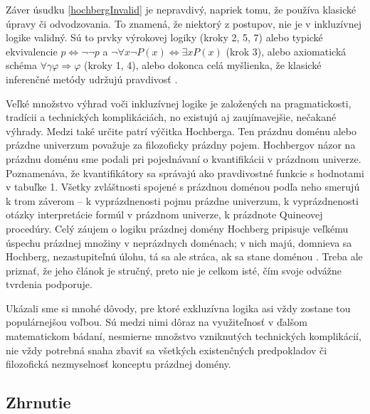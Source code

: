 \documentclass[12pt, letterpaper]{article}
\begin{document}
\noindent Záver úsudku \ref{hochbergInvalid} je nepravdivý, napriek tomu, že používa klasické úpravy či odvodzovania. To znamená, že niektorý z postupov, nie je v inkluzívnej logike validný. Sú to prvky výrokovej logiky (kroky 2, 5, 7) alebo typické ekvivalencie $p \iff \neg\neg p$ a $\neg \forall x \neg P(x) \iff \exists x P(x)$ (krok 3), alebo axiomatická schéma $\forall \gamma  \varphi \Rightarrow \varphi$ (kroky 1, 4), alebo dokonca celá myšlienka, že klasické inferenčné metódy udržujú pravdivosť \parencites[544]{hochberg}.\par


Veľké množstvo výhrad voči inkluzívnej logike je založených na pragmatickosti, tradícii a technických komplikáciách, no existujú aj zaujímavejšie, nečakané výhrady. Medzi také určite patrí výčitka Hochberga. Ten prázdnu doménu alebo prázdne univerzum považuje za filozoficky prázdny pojem. Hochbergov názor na prázdnu doménu sme podali pri pojednávaní o kvantifikácii v prázdnom univerze. Poznamenáva, že kvantifikátory sa správajú ako pravdivostné funkcie s hodnotami v tabuľke 1. Všetky zvláštnosti spojené s prázdnou doménou podľa neho smerujú k trom záverom -- k vyprázdnenosti pojmu prázdne univerzum, k vyprázdnenosti otázky interpretácie formúl v prázdnom univerze, k prázdnote Quineovej procedúry. Celý záujem o logiku prázdnej domény Hochberg pripisuje veľkému úspechu prázdnej množiny v neprázdnych doménach; v nich majú, domnieva sa Hochberg, nezastupiteľnú úlohu, tá sa ale stráca, ak sa stane doménou \parencites[545]{hochberg}. Treba ale priznať, že jeho článok je stručný, preto nie je celkom isté, čím svoje odvážne tvrdenia podporuje.\par

Ukázali sme si mnohé dôvody, pre ktoré exkluzívna logika asi vždy zostane tou populárnejšou voľbou. Sú medzi nimi dôraz na využiteľnosť v ďalšom matematickom bádaní, nesmierne množstvo vzniknutých technických komplikácií, nie vždy potrebná snaha zbaviť sa všetkých existenčných predpokladov či filozofická nezmyselnosť konceptu prázdnej domény.

\subsection{Zhrnutie}
\end{document}
